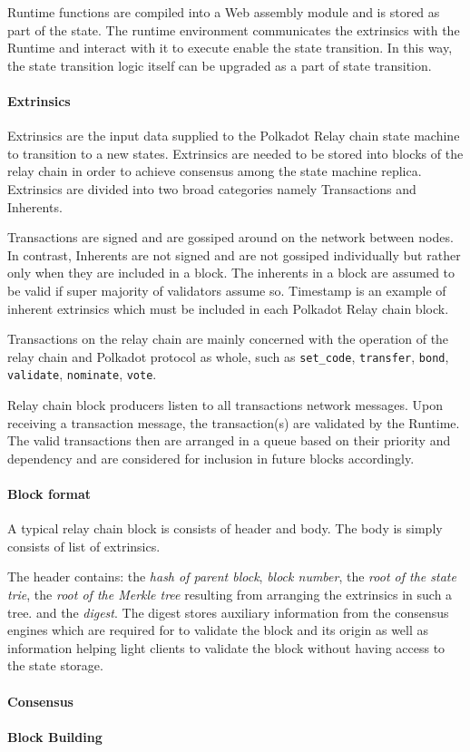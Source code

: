 Runtime functions are compiled into a Web assembly module and is stored as part of the state. The runtime environment communicates the extrinsics with the Runtime and interact with it to execute enable the state transition. In this way, the state transition logic itself can be upgraded as a part of state transition.

\paragraph{Extrinsics}

Extrinsics are the input data supplied to the Polkadot Relay chain state machine to transition to a new states. Extrinsics are needed to be stored into blocks of the relay chain in order to achieve consensus among the state machine replica. Extrinsics are divided into two broad categories namely Transactions and Inherents.

Transactions are signed and are gossiped around on the network between nodes. In contrast, Inherents are not signed and are not gossiped individually but rather only when they are included in a block. The inherents in a block are assumed to be valid if super majority of validators assume so. Timestamp is an example of inherent extrinsics which must be included in each Polkadot Relay chain block.

Transactions on the relay chain are mainly concerned with the operation of the relay chain and Polkadot protocol as whole, such as \texttt{set\_code}, \texttt{transfer}, \texttt{bond}, \texttt{validate}, \texttt{nominate}, \texttt{vote}.

Relay chain block producers listen to all transactions network messages. Upon receiving a transaction message, the transaction(s) are validated by the Runtime. The valid transactions then are arranged in a queue based on their priority and dependency and are considered for inclusion in future blocks accordingly.

\paragraph{Block format}
A typical relay chain block is consists of header and body. The body is simply consists of list of extrinsics.

The header contains: the {\it hash of parent block}, {\it block number}, the {\it root of the state trie}, the {\it root of the Merkle tree} resulting from arranging the extrinsics in such a tree. and the {\it digest}. The digest stores auxiliary information from the consensus engines which are required for to validate the block and its origin as well as information helping light clients to validate the block without having access to the state storage.

\paragraph{Consensus}



\paragraph{Block Building}\label{sec:relaychainblockproduction}



